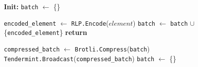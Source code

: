 \begin{figure}[t!]
  \begin{adjustbox}{minipage=[t]{\columnwidth}}
    \begin{algorithm}[H]
      \renewcommand{\thealgorithm}{Compress Collector}         
      \caption{}%
      \label{alg:collector-brotli}%
      \small
      \begin{algorithmic}[1]
            \State \textbf{Init:} \texttt{batch} $\leftarrow$ \{\}
      
            \label{alg:brotli_add_tx}
            			\State \texttt{encoded\_element} $\leftarrow$ \texttt{RLP.Encode}($element$)
					        \State \texttt{batch} $\leftarrow$ \texttt{batch} $\cup$ \{\texttt{encoded\_element}\}
                \EndIf
                \State \textbf{return}
            \EndFunction
            
            \smallskip

              \State \texttt{compressed\_batch} $\leftarrow$  \texttt{Brotli.Compress}(\texttt{batch})
              \State \texttt{Tendermint.Broadcast}(\texttt{compressed\_batch})
              \State \texttt{batch} $\leftarrow$ \{\}
            \EndWhen
            
        \end{algorithmic}
      \end{algorithm}
	\end{adjustbox}
  \end{figure}

